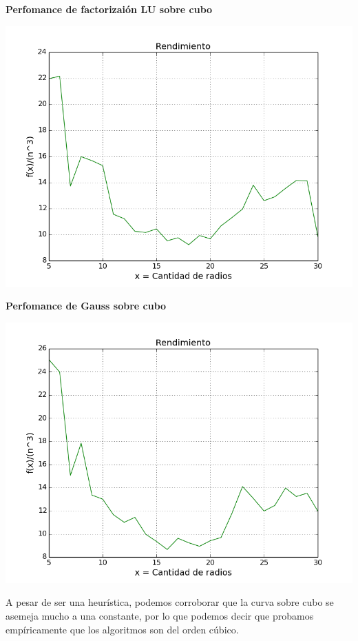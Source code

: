  \textbf{Perfomance de factorizai\'on LU sobre cubo}\\


\begin{center}
\includegraphics[scale=0.65]{experimentos2a_2b/LuCubo.png}
\end{center}

 \textbf{Perfomance de Gauss sobre cubo}\\


\begin{center}
\includegraphics[scale=0.65]{experimentos2a_2b/GaussCubo.png}
\end{center}

A pesar de ser una heur\'istica, podemos corroborar que la curva sobre cubo se asemeja mucho a una constante, por lo que podemos decir que probamos emp\'iricamente que los algoritmos son del orden c\'ubico.

